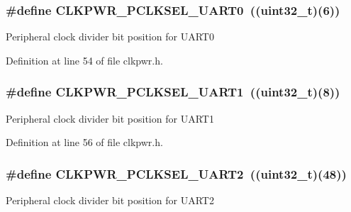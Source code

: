 \subsubsection[{\texorpdfstring{C\+L\+K\+P\+W\+R\+\_\+\+P\+C\+L\+K\+S\+E\+L\+\_\+\+U\+A\+R\+T0}{CLKPWR_PCLKSEL_UART0}}]{\setlength{\rightskip}{0pt plus 5cm}\#define C\+L\+K\+P\+W\+R\+\_\+\+P\+C\+L\+K\+S\+E\+L\+\_\+\+U\+A\+R\+T0~(({\bf uint32\+\_\+t})(6))}\hypertarget{group___c_l_k_p_w_r___public___macros_gab55e1cb2751a05bac54292939ce3937b}{}\label{group___c_l_k_p_w_r___public___macros_gab55e1cb2751a05bac54292939ce3937b}
Peripheral clock divider bit position for U\+A\+R\+T0 

Definition at line 54 of file clkpwr.\+h.

\subsubsection[{\texorpdfstring{C\+L\+K\+P\+W\+R\+\_\+\+P\+C\+L\+K\+S\+E\+L\+\_\+\+U\+A\+R\+T1}{CLKPWR_PCLKSEL_UART1}}]{\setlength{\rightskip}{0pt plus 5cm}\#define C\+L\+K\+P\+W\+R\+\_\+\+P\+C\+L\+K\+S\+E\+L\+\_\+\+U\+A\+R\+T1~(({\bf uint32\+\_\+t})(8))}\hypertarget{group___c_l_k_p_w_r___public___macros_ga1e565a2eb1621b007b3f11725637474d}{}\label{group___c_l_k_p_w_r___public___macros_ga1e565a2eb1621b007b3f11725637474d}
Peripheral clock divider bit position for U\+A\+R\+T1 

Definition at line 56 of file clkpwr.\+h.

\subsubsection[{\texorpdfstring{C\+L\+K\+P\+W\+R\+\_\+\+P\+C\+L\+K\+S\+E\+L\+\_\+\+U\+A\+R\+T2}{CLKPWR_PCLKSEL_UART2}}]{\setlength{\rightskip}{0pt plus 5cm}\#define C\+L\+K\+P\+W\+R\+\_\+\+P\+C\+L\+K\+S\+E\+L\+\_\+\+U\+A\+R\+T2~(({\bf uint32\+\_\+t})(48))}\hypertarget{group___c_l_k_p_w_r___public___macros_ga2b7eb179fdd09c99ddadac8c4d144142}{}\label{group___c_l_k_p_w_r___public___macros_ga2b7eb179fdd09c99ddadac8c4d144142}
Peripheral clock divider bit position for U\+A\+R\+T2 

